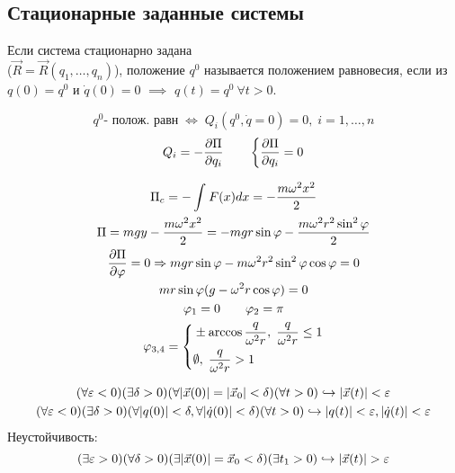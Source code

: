 \documentclass{article}
\begin{document}
\subsection{Стационарные заданные системы}
\begin{definition}
  Если система стационарно задана \\ 
  ($\vec{R}=\vec{R}(q_1,\dots ,q_n)$),
  положение $q^{0}$ называется положением равновесия,
  если из $q(0)=q^{0}$ и $\dot{q}(0) = 0$ $\implies$ $q(t)=q^{0} \ \forall t>0$.
\end{definition}
\begin{theorem}
  \[
    q^{0} \text{- полож. равн} \; \Leftrightarrow \; Q_i(q^{0},\dot{q}=0)=0, \; i=1,\dots ,n
  \]
  \[
    Q_i=-\frac{\partial{\Pi}}{\partial{q_i}} \qquad \left\{\begin{aligned}
      \frac{\partial{\Pi}}{\partial{q_i}}=0
    \end{aligned}\right.
  \]
\end{theorem}
\begin{eg}

  
  \begin{gather*}
    \Pi_{c}=-\int_{}^{}F(x)dx=-\frac{m\omega^{2}x^{2}}{2} \\ 
    \Pi = mgy - \frac{m\omega^{2}x^{2}}{2}=-mgr\sin \varphi - \frac{m\omega^{2}r^{2}\sin^{2}\varphi}{2} \\ 
    \frac{\partial{\Pi}}{\partial{\varphi}}=0 \Rightarrow mgr\sin\varphi - m\omega^{2}r^{2}\sin^{2}\varphi\cos\varphi =0 \\
    mr\sin\varphi(g-\omega^{2}r\cos \varphi)=0 \\ 
    \varphi_1 = 0 \qquad \varphi_2=\pi \\ 
    \varphi_{3,4}= \left\{\begin{aligned}
      & \pm \arccos \frac{q}{\omega^{2}r}, \; \frac{q}{\omega^{2}r} \le 1 \\ 
      & \emptyset, \; \frac{q}{\omega^{2}r}>1
    \end{aligned}\right.
  \end{gather*}
\end{eg}
\begin{definition}
    \begin{gather*}
        (\forall \varepsilon<0)(\exists \delta>0)(\forall|\vec{x}(0)|=|\vec{x}_0|<\delta)(\forall t>0)\hookrightarrow |\vec{x}(t)|<\varepsilon \\
        (\forall \varepsilon<0)(\exists \delta>0)(\forall|q(0)|<\delta, \forall |\dot{q}(0)|<\delta)(\forall t>0) \hookrightarrow |q(t)|<\varepsilon, |\dot{q}(t)|<\varepsilon
    \end{gather*}
    Неустойчивость:
    \[
      (\exists \epsilon>0)(\forall \delta>0)(\exists|\vec{x}(0)|=\vec{x}_0<\delta)(\exists t_1>0)\true |\vec{x}(t)|>\epsilon
    \]
\end{definition}
 
\end{document}
